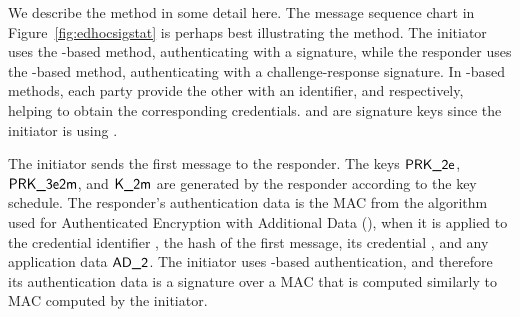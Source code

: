 %
%

We describe the \mSigStat{} method in some detail here.
%
The message sequence chart in Figure~\ref{fig:edhocsigstat} is perhaps best
illustrating the method.
%
The initiator uses the \mSig{}-based method, authenticating with a signature,
while the responder uses the \mStat{}-based method, authenticating with a
challenge-response signature.
%
In \mStat{}-based methods, each party provide the other with an identifier,
\mIdcredi{} and \mIdcredr{} respectively, helping to obtain the corresponding
credentials.
%
\mCredi{} and \mLtki{} are signature keys since the initiator is using
\mSig.

The initiator sends the first message to the responder.
%
The keys $\textsf{PRK\_2e}$, $\textsf{PRK\_3e2m}$, and $\textsf{K\_2m}$ are generated by the responder
according to the key schedule.
%
The responder's authentication data \mAuthr{} is the MAC from the algorithm used
for Authenticated Encryption with Additional Data (\mAead{}), when it is applied
to the credential identifier \mIdcredr{}, the hash of the first
message, its credential \mCredr{}, and any application data $\textsf{AD\_2}$.
%
The initiator uses \mSig{}-based authentication, and therefore its
authentication data
\mAuthi{} is a signature over a MAC that is computed similarly to MAC computed
by the initiator.

